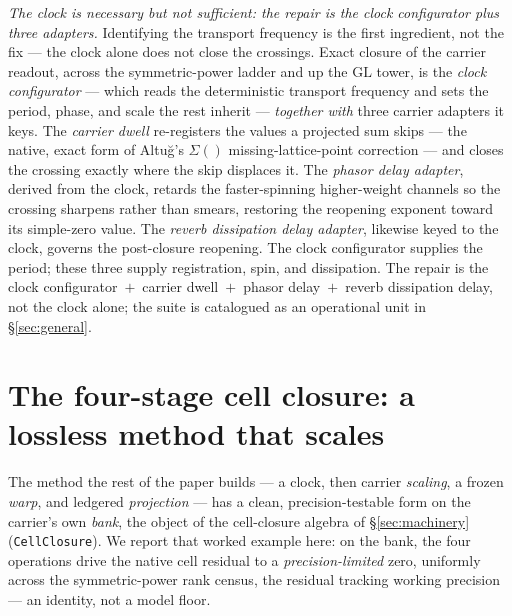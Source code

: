 \documentclass[11pt]{article}
\theoremstyle{definition}
\begin{document}
\emph{The clock is necessary but not sufficient: the repair is the clock configurator plus three adapters.}
Identifying the transport frequency is the first ingredient, not the fix --- the clock alone does not close the
crossings. Exact closure of the carrier readout, across the symmetric-power ladder and up the $\mathrm{GL}$
tower, is the \emph{clock configurator} --- which reads the deterministic transport frequency and sets the
period, phase, and scale the rest inherit --- \emph{together with} three carrier adapters it keys. The
\emph{carrier dwell} re-registers the values a projected sum skips --- the native, exact form of Altu\u{g}'s
$\Sigma()$ missing-lattice-point correction --- and closes the crossing exactly where the skip displaces it. The
\emph{phasor delay adapter}, derived from the clock, retards the faster-spinning higher-weight channels so the
crossing sharpens rather than smears, restoring the reopening exponent toward its simple-zero value. The
\emph{reverb dissipation delay adapter}, likewise keyed to the clock, governs the post-closure reopening. The
clock configurator supplies the period; these three supply registration, spin, and dissipation. The repair is
the clock configurator~$+$~carrier dwell~$+$~phasor delay~$+$~reverb dissipation delay, not the clock alone; the
suite is catalogued as an operational unit in \S\ref{sec:general}.

\section{The four-stage cell closure: a lossless method that scales}\label{sec:pipeline}

The method the rest of the paper builds --- a clock, then carrier \emph{scaling}, a frozen \emph{warp}, and
ledgered \emph{projection} --- has a clean, precision-testable form on the carrier's own \emph{bank}, the
object of the cell-closure algebra of \S\ref{sec:machinery} (\texttt{CellClosure}). We report that worked
example here: on the bank, the four operations drive the native cell residual to a \emph{precision-limited}
zero, uniformly across the symmetric-power rank census, the residual tracking working precision --- an
identity, not a model floor.
\end{document}
